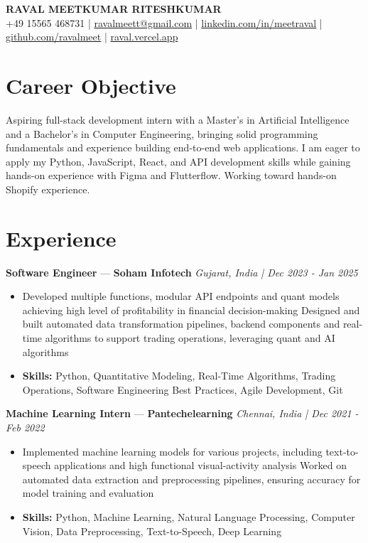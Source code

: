 \documentclass[a4paper,10pt]{article}
\begin{document}
\begin{center}
  {\Large\bfseries RAVAL MEETKUMAR RITESHKUMAR}\\[2pt]
  {\small +49 15565 468731 \;|\; \href{mailto:ravalmeett@gmail.com}{ravalmeett@gmail.com} \;|\; \href{https://www.linkedin.com/in/meetraval/}{linkedin.com/in/meetraval} \;|\; \href{https://github.com/ravalmeet}{github.com/ravalmeet} \;|\; \href{https://raval.vercel.app/}{raval.vercel.app}}
\end{center}
\vspace{-3pt}

\section*{Career Objective}
Aspiring full-stack development intern with a Master's in Artificial Intelligence and a Bachelor's in Computer Engineering, bringing solid programming fundamentals and experience building end-to-end web applications. I am eager to apply my Python, JavaScript, React, and API development skills while gaining hands-on experience with Figma and Flutterflow. Working toward hands-on Shopify experience.\par

\section*{Experience}
\textbf{Software Engineer} — \textbf{Soham Infotech} \hfill \textit{Gujarat, India \;|\; Dec 2023 - Jan 2025}\par
\vspace{1pt}
\begin{itemize}
  \item Developed multiple functions, modular API endpoints and quant models achieving high level of profitability in financial decision-making Designed and built automated data transformation pipelines, backend components and real-time algorithms to support trading operations, leveraging quant and AI algorithms
  \item \textbf{Skills:} Python, Quantitative Modeling, Real-Time Algorithms, Trading Operations, Software Engineering Best Practices, Agile Development, Git
\end{itemize}
\vspace{3pt}
\textbf{Machine Learning Intern} — \textbf{Pantechelearning} \hfill \textit{Chennai, India \;|\; Dec 2021 - Feb 2022}\par
\vspace{1pt}
\begin{itemize}
  \item Implemented machine learning models for various projects, including text-to-speech applications and high functional visual-activity analysis Worked on automated data extraction and preprocessing pipelines, ensuring accuracy for model training and evaluation
  \item \textbf{Skills:} Python, Machine Learning, Natural Language Processing, Computer Vision, Data Preprocessing, Text-to-Speech, Deep Learning
\end{itemize}
\end{document}
